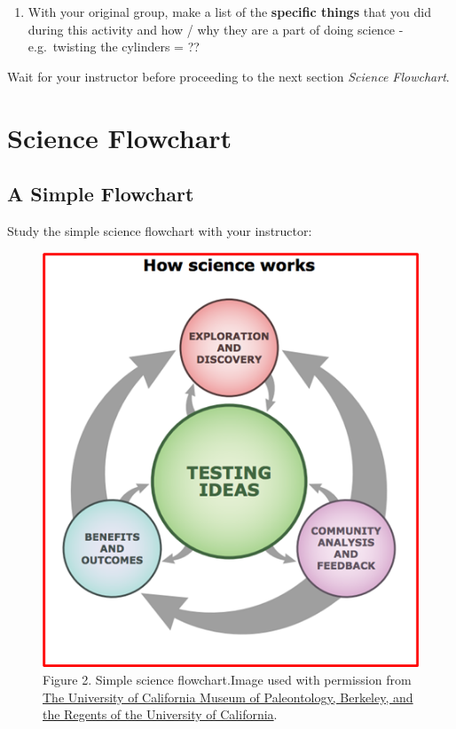 \documentclass[
]{book}
\providecommand{\tightlist}{%
  \setlength{\itemsep}{0pt}\setlength{\parskip}{0pt}}
\begin{document}
\begin{enumerate}
\def\labelenumi{\arabic{enumi}.}
\tightlist
\item
  With your original group, make a list of the \textbf{specific things} that you did during this activity and how / why they are a part of doing science - e.g.~twisting the cylinders = ??
\end{enumerate}

Wait for your instructor before proceeding to the next section \emph{Science Flowchart}.

\hypertarget{science-flowchart}{%
\chapter*{Science Flowchart}\label{science-flowchart}}

\hypertarget{a-simple-flowchart}{%
\section*{A Simple Flowchart}\label{a-simple-flowchart}}

Study the simple science flowchart with your instructor:

\begin{figure}
\centering
\includegraphics{figures_images/Lab2a-Fig2.png}
\caption{Figure 2. Simple science flowchart.Image used with permission from \href{https://qubeshub.org/community/groups/coursesource/publications?id=2625\&v=1}{The University of California Museum of Paleontology, Berkeley, and the Regents of the University of California}.}
\end{figure}
\end{document}
